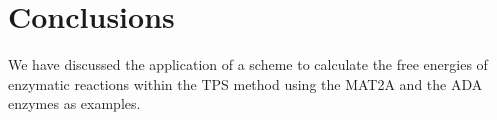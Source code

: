 \documentclass[journal=jpcbfk,manuscript=article,layout=traditional]{achemso}
\begin{document}
\section{Conclusions}
We have discussed the application of a scheme to calculate the 
free energies of enzymatic reactions within the TPS method using the MAT2A
and the ADA enzymes as examples. 

\begin{acknowledgement}


\end{acknowledgement}

\begin{suppinfo}


\end{suppinfo}


\end{document}

